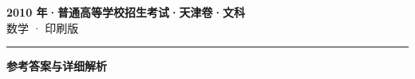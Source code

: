 \documentclass[zihao=5, a4paper]{ctexart}
\begin{document}
\begin{center}
  {\Large\bfseries 2010 年·普通高等学校招生考试·天津卷·文科}\\[4pt]
  {\large 数学 · 印刷版}
\end{center}
\medskip
{}

\par\bigskip\hrule\bigskip
{}
\begin{center}{\large\bfseries 参考答案与详细解析}\end{center}
\smallskip

\end{document}
